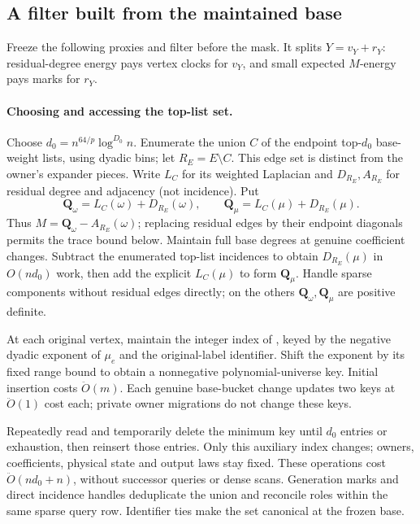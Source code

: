 \documentclass[11pt]{article}
\theoremstyle{remark}
\newcommand{\QQ}{\mathbf Q}
\renewcommand{\O}{\ddot{O}}
\begin{document}
\subsection{A filter built from the maintained base}

Freeze the following proxies and filter before the mask.
It splits $Y=v_Y+r_Y$: residual-degree energy pays vertex clocks for $v_Y$, and
small expected $M$-energy pays marks for $r_Y$.

\paragraph{Choosing and accessing the top-list set.}
Choose $d_0= n^{64/p}\log^{D_0} n $.
Enumerate the union $C$ of the endpoint top-$d_0$ base-weight lists, using
dyadic bins; let $R_E=E\setminus C$.
This edge set is distinct from the owner's expander pieces.
Write $L_C$ for its weighted Laplacian and $D_{R_E},A_{R_E}$ for residual degree
and adjacency (not incidence).
Put
\[
 \QQ_\omega=L_C(\omega)+D_{R_E}(\omega),\qquad
 \QQ_\mu=L_C(\mu)+D_{R_E}(\mu).
\]
Thus $M=\QQ_\omega-A_{R_E}(\omega)$; replacing residual edges by their endpoint diagonals
permits the trace bound below.
Maintain full base degrees at genuine coefficient changes.
Subtract the enumerated top-list incidences to obtain $D_{R_E}(\mu)$ in
$O(nd_0)$ work, then add the explicit $L_C(\mu)$ to form $\QQ_\mu$.
Handle sparse components without residual edges directly; on the others $\QQ_\omega,\QQ_\mu$
are positive definite.

At each original vertex, maintain the integer index of
, keyed by the negative dyadic exponent of $\mu_e$
and the original-label identifier.
Shift the exponent by its fixed range bound to obtain a nonnegative
polynomial-universe key.
Initial insertion costs $\O(m)$.
Each genuine base-bucket change updates two keys at $\O(1)$ cost each; private
owner migrations do not change these keys.

Repeatedly read and temporarily delete the minimum key until $d_0$ entries or
exhaustion, then reinsert those entries.
Only this auxiliary index changes; owners, coefficients, physical state and
output laws stay fixed.
These operations cost $\O(nd_0+n)$, without successor queries or dense scans.
Generation marks and direct incidence handles deduplicate the union and
reconcile roles within the same sparse query row.
Identifier ties make the set canonical at the frozen base.
\end{document}
